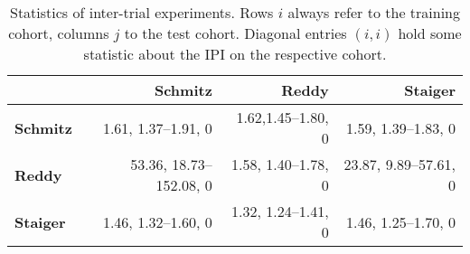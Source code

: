 \begin{table}
    \vspace{0.5cm}
    \begin{subtable}{\textwidth}
        \centering
        \begin{tabular}{lrrr}
            \hline
            & \textbf{Schmitz} & \textbf{Reddy} & \textbf{Staiger} \\
            \hline
            \textbf{Schmitz} & \num{1.61}, \num{1.37}--\num{1.91}, \num{0} & 
                \num{1.62},\num{1.45}--\num{1.80}, \num{0} & 
                \num{1.59}, \num{1.39}--\num{1.83}, 0 \\
            \textbf{Reddy} & \num{53.36}, \num{18.73}--\num{152.08}, 0 & 
                \num{1.58}, \num{1.40}--\num{1.78}, \num{0} & 
                \num{23.87}, \num{9.89}--\num{57.61}, 0 \\
            \textbf{Staiger} & \num{1.46}, \num{1.32}--\num{1.60}, 0 & 
                \num{1.32}, \num{1.24}--\num{1.41}, \num{0} & 
                \num{1.46}, \num{1.25}--\num{1.70}, \num{0} \\
            \hline
        \end{tabular}
        \caption{Hazard ratio, its \num{95}\%-confidence interval and p-value for the null 
            hypothesis of the hazard ratio being equal to one. Diagonal entries show these 
            properties for the $\text{tIPI}$, off-diagonal entries for the best model trained and 
            validated on cohort $i$, $m_i^*$. All p-values are below 
            \num[scientific-notation]{5e-6} and hence rounded to $\num{0}$.}
            \label{subtab:inter-hr}
    \end{subtable}
    \caption{Statistics of inter-trial experiments. Rows $i$ always refer to the training cohort, 
        columns $j$ to the test cohort. Diagonal entries $(i, i)$ hold some statistic about the 
        IPI on the respective cohort.}
    \label{table:inter-trial}
\end{table}